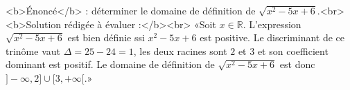<b>Énoncé</b> : déterminer le domaine de définition de $\sqrt{x^2-5x+6}$.<br> <b>Solution rédigée à évaluer :</b><br>  «Soit $x\in\mathbb{R}$.  L'expression $\sqrt{x^2-5x+6}$ est bien définie ssi $x^2-5x+6$ est positive. Le discriminant de ce trinôme vaut $\Delta = 25-24=1$, les deux racines sont $2$ et $3$ et son coefficient dominant est positif. Le domaine de définition de $\sqrt{x^2-5x+6}$ est donc $]-\infty,2]\cup[3,+\infty[$.»

\begin{reponses}
\end{reponses}

\begin{comment}
Réponse correcte même si c'est dommage d'utiliser le discriminant pour un trinôme facile à factoriser comme celui-ci.
\end{comment}

